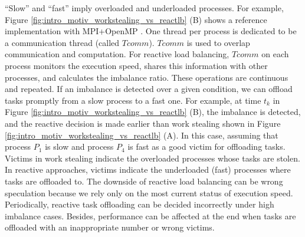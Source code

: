``Slow'' and ``fast'' imply overloaded and underloaded processes. For example, Figure \ref{fig:intro_motiv_workstealing_vs_reactlb} (B) shows a reference implementation with MPI+OpenMP \cite{rabenseifner2009hybrid}. One thread per process is dedicated to be a communication thread (called $Tcomm$). $Tcomm$ is used to overlap communication and computation. For reactive load balancing, $Tcomm$ on each process monitors the execution speed, shares this information with other processes, and calculates the imbalance ratio. These operations are continuous and repeated. If an imbalance is detected over a given condition, we can offload tasks promptly from a slow process to a fast one. For example, at time $t_{k}$ in Figure \ref{fig:intro_motiv_workstealing_vs_reactlb} (B), the imbalance is detected, and the reactive decision is made earlier than work stealing shown in Figure \ref{fig:intro_motiv_workstealing_vs_reactlb} (A). In this case, assuming that process $P_{1}$ is slow and process $P_{4}$ is fast as a good victim for offloading tasks. Victims in work stealing indicate the overloaded processes whose tasks are stolen. In reactive approaches, victims indicate the underloaded (fast) processes where tasks are offloaded to. The downside of reactive load balancing can be wrong speculation because we rely only on the most current status of execution speed. Periodically, reactive task offloading can be decided incorrectly under high imbalance cases. Besides, performance can be affected at the end when tasks are offloaded with an inappropriate number or wrong victims. \\

